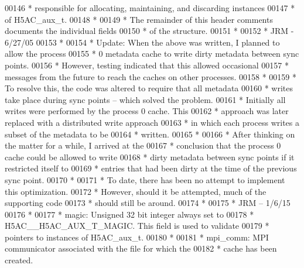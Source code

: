 \begin{DoxyCode}
00146 \textcolor{comment}{ * responsible for allocating, maintaining, and discarding instances}
00147 \textcolor{comment}{ * of H5AC\_aux\_t.}
00148 \textcolor{comment}{ *}
00149 \textcolor{comment}{ * The remainder of this header comments documents the individual fields}
00150 \textcolor{comment}{ * of the structure.}
00151 \textcolor{comment}{ *}
00152 \textcolor{comment}{ *                                              JRM - 6/27/05}
00153 \textcolor{comment}{ *}
00154 \textcolor{comment}{ * Update: When the above was written, I planned to allow the process}
00155 \textcolor{comment}{ *  0 metadata cache to write dirty metadata between sync points.}
00156 \textcolor{comment}{ *  However, testing indicated that this allowed occasional }
00157 \textcolor{comment}{ *  messages from the future to reach the caches on other processes.}
00158 \textcolor{comment}{ *}
00159 \textcolor{comment}{ *  To resolve this, the code was altered to require that all metadata}
00160 \textcolor{comment}{ *  writes take place during sync points -- which solved the problem.}
00161 \textcolor{comment}{ *  Initially all writes were performed by the process 0 cache.  This }
00162 \textcolor{comment}{ *  approach was later replaced with a distributed write approach}
00163 \textcolor{comment}{ *  in which each process writes a subset of the metadata to be }
00164 \textcolor{comment}{ *  written.  }
00165 \textcolor{comment}{ *}
00166 \textcolor{comment}{ *  After thinking on the matter for a while, I arrived at the }
00167 \textcolor{comment}{ *  conclusion that the process 0 cache could be allowed to write }
00168 \textcolor{comment}{ *  dirty metadata between sync points if it restricted itself to }
00169 \textcolor{comment}{ *  entries that had been dirty at the time of the previous sync point.  }
00170 \textcolor{comment}{ *  }
00171 \textcolor{comment}{ *  To date, there has been no attempt to implement this optimization.}
00172 \textcolor{comment}{ *  However, should it be attempted, much of the supporting code }
00173 \textcolor{comment}{ *  should still be around.}
00174 \textcolor{comment}{ *}
00175 \textcolor{comment}{ *                      JRM -- 1/6/15}
00176 \textcolor{comment}{ *}
00177 \textcolor{comment}{ * magic:       Unsigned 32 bit integer always set to}
00178 \textcolor{comment}{ *      H5AC\_\_H5AC\_AUX\_T\_MAGIC.  This field is used to validate}
00179 \textcolor{comment}{ *      pointers to instances of H5AC\_aux\_t.}
00180 \textcolor{comment}{ *}
00181 \textcolor{comment}{ * mpi\_comm:    MPI communicator associated with the file for which the}
00182 \textcolor{comment}{ *      cache has been created.}

\end{DoxyCode}
